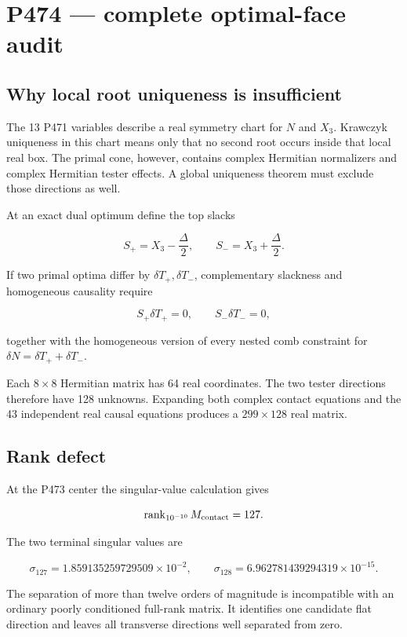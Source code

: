\documentclass[11pt,a4paper,openany]{report}
\begin{document}
\chapter{P474 --- complete optimal-face audit}

\section{Why local root uniqueness is insufficient}

The 13 P471 variables describe a real symmetry chart for \(N\) and \(X_3\). Krawczyk uniqueness in this chart means only that no second root occurs inside that local real box. The primal cone, however, contains complex Hermitian normalizers and complex Hermitian tester effects. A global uniqueness theorem must exclude those directions as well.

At an exact dual optimum define the top slacks

\[
S_+=X_3-\frac{\Delta}{2},\qquad
S_-=X_3+\frac{\Delta}{2}.
\]

If two primal optima differ by \(\delta T_+,\delta T_-\), complementary slackness and homogeneous causality require

\[
S_+\delta T_+=0,
\qquad
S_-\delta T_-=0,
\]

together with the homogeneous version of every nested comb constraint for \(\delta N=\delta T_++\delta T_-\).

Each \(8\times8\) Hermitian matrix has 64 real coordinates. The two tester directions therefore have 128 unknowns. Expanding both complex contact equations and the 43 independent real causal equations produces a \(299\times128\) real matrix.

\section{Rank defect}

At the P473 center the singular-value calculation gives

\[
\operatorname{rank}_{10^{-10}}M_{\rm contact}=127.
\]

The two terminal singular values are

\[
\sigma_{127}=1.859135259729509\times10^{-2},
\qquad
\sigma_{128}=6.962781439294319\times10^{-15}.
\]

The separation of more than twelve orders of magnitude is incompatible with an ordinary poorly conditioned full-rank matrix. It identifies one candidate flat direction and leaves all transverse directions well separated from zero.
\end{document}
